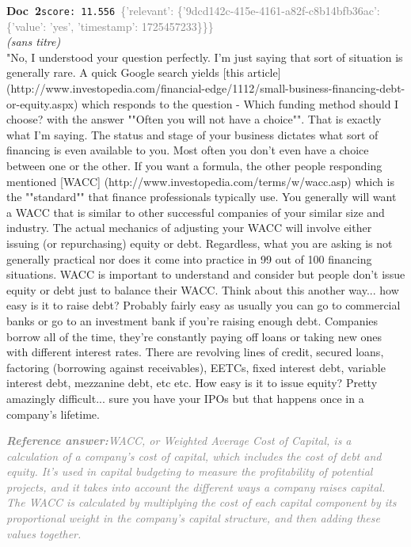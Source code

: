 \documentclass[a4paper,11pt]{article}
\begin{document}
\begin{docenv}
{\footnotesize\textcolor{doccolor}{\textbf{Doc~2}}}\hfill{\tiny\texttt{score:~11.556}}\ {\tiny\textcolor{gray}{\{'relevant': \{'9dcd142c-415e-4161-a82f-c8b14bfb36ac': \{'value': 'yes', 'timestamp': 1725457233\}\}\}}}\\[3pt]
{\small\textit{(sans titre)}}\\[2pt]
\vspace{2pt}
{\footnotesize 
"No, I understood your question perfectly. I'm just saying that sort of situation is generally rare. A quick Google search yields [this article] (http://www.investopedia.com/financial-edge/1112/small-business-financing-debt-or-equity.aspx) which responds to the question - Which funding method should I choose? with the answer ""Often you will not have a choice"". That is exactly what I'm saying. The status and stage of your business dictates what sort of financing is even available to you. Most often you don't even have a choice between one or the other. If you want a formula, the other people responding mentioned [WACC] (http://www.investopedia.com/terms/w/wacc.asp) which is the ""standard"" that finance professionals typically use. You generally will want a WACC that is similar to other successful companies of your similar size and industry. The actual mechanics of adjusting your WACC will involve either issuing (or repurchasing) equity or debt. Regardless, what you are asking is not generally practical nor does it come into practice in 99 out of 100 financing situations. WACC is important to understand and consider but people don't issue equity or debt just to balance their WACC. Think about this another way... how easy is it to raise debt? Probably fairly easy as usually you can go to commercial banks or go to an investment bank if you're raising enough debt. Companies borrow all of the time, they're constantly paying off loans or taking new ones with different interest rates. There are revolving lines of credit, secured loans, factoring (borrowing against receivables), EETCs, fixed interest debt, variable interest debt, mezzanine debt, etc etc. How easy is it to issue equity? Pretty amazingly difficult... sure you have your IPOs but that happens once in a company's lifetime.}
\end{docenv}
\begin{refanswerenv}
{\footnotesize\textit{\textcolor{gray}{\textbf{Reference answer:}\enspace WACC, or Weighted Average Cost of Capital, is a calculation of a company's cost of capital, which includes the cost of debt and equity. It's used in capital budgeting to measure the profitability of potential projects, and it takes into account the different ways a company raises capital. The WACC is calculated by multiplying the cost of each capital component by its proportional weight in the company's capital structure, and then adding these values together.}}}
\end{refanswerenv}
\end{document}
